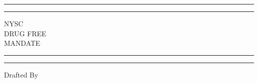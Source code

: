 \documentclass{report}
\begin{document}
\begin{titlepage} %

	\centering %
	
	\scshape %
	
	\vspace*{\baselineskip} %
	
	
	\rule{\textwidth}{1.6pt}\vspace*{-\baselineskip}\vspace*{2pt} %
	\rule{\textwidth}{0.4pt} %
	
	\vspace{0.75\baselineskip} %
	
	{\LARGE NYSC\\ DRUG FREE\\ MANDATE\\} %
	
	\vspace{0.75\baselineskip} %
	
	\rule{\textwidth}{0.4pt}\vspace*{-\baselineskip}\vspace{3.2pt} %
	\rule{\textwidth}{1.6pt} %
	
	\vspace{2\baselineskip} %
	
	
	
	\vspace*{3\baselineskip} %
	
	
	\vspace*{1\baselineskip}
	
	Drafted By
	

\end{titlepage}
\end{document}
